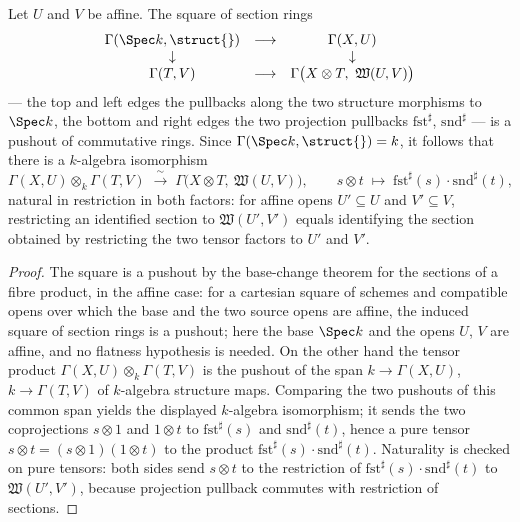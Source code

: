 \begin{definition}
  \label{def:productChartSections}
  \leanok
  Let \(U\) and \(V\) be affine. The square of section rings
  \[
    \begin{array}{ccc}
      \Gamma(\Spec k, \struct{}) & \longrightarrow & \Gamma(X, U) \\
      \downarrow & & \downarrow \\
      \Gamma(T, V) & \longrightarrow & \Gamma\bigl(X \otimes T,\ \mathfrak W(U,V)\bigr)
    \end{array}
  \]
  --- the top and left edges the pullbacks along the two structure morphisms to \(\Spec k\), the
  bottom and right edges the two projection pullbacks \(\mathrm{fst}^\sharp\),
  \(\mathrm{snd}^\sharp\) --- is a pushout of commutative rings. Since
  \(\Gamma(\Spec k, \struct{}) = k\), it follows that there is a \(k\)-algebra isomorphism
  \[
    \Gamma(X, U) \otimes_k \Gamma(T, V) \;\xrightarrow{\ \sim\ }\;
      \Gamma\bigl(X \otimes T,\ \mathfrak W(U,V)\bigr), \qquad
      s \otimes t \;\longmapsto\; \mathrm{fst}^\sharp(s) \cdot \mathrm{snd}^\sharp(t),
  \]
  natural in restriction in both factors: for affine opens \(U' \subseteq U\) and
  \(V' \subseteq V\), restricting an identified section to \(\mathfrak W(U', V')\) equals
  identifying the section obtained by restricting the two tensor factors to \(U'\) and \(V'\).
\end{definition}
\begin{proof}
  \leanok
  The square is a pushout by the base-change theorem for the sections of a fibre product, in the
  affine case: for a cartesian square of schemes and compatible opens over which the base and the
  two source opens are affine, the induced square of section rings is a pushout; here the base
  \(\Spec k\) and the opens \(U\), \(V\) are affine, and no flatness hypothesis is needed. On the
  other hand the tensor product \(\Gamma(X,U) \otimes_k \Gamma(T,V)\) is the pushout of the span
  \(k \to \Gamma(X,U)\), \(k \to \Gamma(T,V)\) of \(k\)-algebra structure maps. Comparing the two
  pushouts of this common span yields the displayed \(k\)-algebra isomorphism; it sends the two
  coprojections \(s \otimes 1\) and \(1 \otimes t\) to \(\mathrm{fst}^\sharp(s)\) and
  \(\mathrm{snd}^\sharp(t)\), hence a pure tensor \(s \otimes t = (s \otimes 1)(1 \otimes t)\) to
  the product \(\mathrm{fst}^\sharp(s) \cdot \mathrm{snd}^\sharp(t)\). Naturality is checked on
  pure tensors: both sides send \(s \otimes t\) to the restriction of
  \(\mathrm{fst}^\sharp(s) \cdot \mathrm{snd}^\sharp(t)\) to \(\mathfrak W(U',V')\), because
  projection pullback commutes with restriction of sections.
\end{proof}

